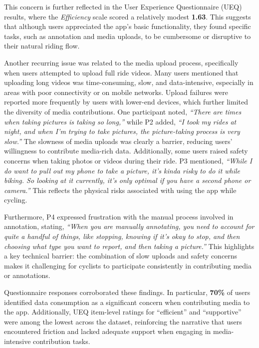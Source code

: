 This concern is further reflected in the User Experience Questionnaire (UEQ) results, where the \textit{Efficiency} scale scored a relatively modest \textbf{1.63}. This suggests that although users appreciated the app's basic functionality, they found specific tasks, such as annotation and media uploads, to be cumbersome or disruptive to their natural riding flow.

Another recurring issue was related to the media upload process, specifically when users attempted to upload full ride videos. Many users mentioned that uploading long videos was time-consuming, slow, and data-intensive, especially in areas with poor connectivity or on mobile networks. Upload failures were reported more frequently by users with lower-end devices, which further limited the diversity of media contributions. One participant noted, \textit{``There are times when taking pictures is taking so long,''} while P2 added, \textit{``I took my rides at night, and when I'm trying to take pictures, the picture-taking process is very slow.''} The slowness of media uploads was clearly a barrier, reducing users' willingness to contribute media-rich data. Additionally, some users raised safety concerns when taking photos or videos during their ride. P3 mentioned, \textit{``While I do want to pull out my phone to take a picture, it's kinda risky to do it while biking. So looking at it currently, it's only optimal if you have a second phone or camera.''} This reflects the physical risks associated with using the app while cycling.

Furthermore, P4 expressed frustration with the manual process involved in annotation, stating, \textit{``When you are manually annotating, you need to account for quite a handful of things, like stopping, knowing if it's okay to stop, and then choosing what type you want to report, and then taking a picture.''} This highlights a key technical barrier: the combination of slow uploads and safety concerns makes it challenging for cyclists to participate consistently in contributing media or annotations.

Questionnaire responses corroborated these findings. In particular, \textbf{70\%} of users identified data consumption as a significant concern when contributing media to the app. Additionally, UEQ item-level ratings for ``efficient'' and ``supportive'' were among the lowest across the dataset, reinforcing the narrative that users encountered friction and lacked adequate support when engaging in media-intensive contribution tasks.

